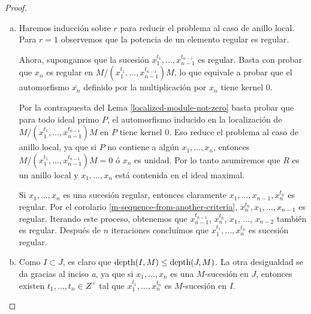 \begin{proof}
\begin{enumerate}[a.]
\item Haremos inducción sobre $r$ para reducir el problema al caso de anillo local. Para $r = 1$ observemos que la potencia de un elemento regular es regular.

Ahora, supongamos que la sucesión $x_1^{t_1},\dots,x_{n-1}^{t_{n-1}}$ es regular. Basta con probar que $x_n$ es regular en $M/(x_1^{t_1},\dots,x_{n-1}^{t_{n-1}})M$, lo que equivale a probar que el automorfismo $\bar{x_n}$ definido por la multiplicación por $x_n$ tiene kernel 0. 

Por la contrapuesta del Lema \ref{localized-module-not-zero} basta probar que para todo ideal primo $P$, el automorfismo inducido en la localización de $M/(x_1^{t_1},\dots,x_{n-1}^{t_{n-1}})M$ en $P$ tiene kernel 0. Eso reduce el problema al caso de anillo local, ya que si $P$ no contiene a algún $x_1,\dots,x_n$, entonces $M/(x_1^{t_1},\dots,x_{n-1}^{t_{n-1}})M = 0$ ó $x_n$ es unidad. Por lo tanto asumiremos que $R$ es un anillo local y $x_1,\dots,x_n$ está contenida en el ideal maximal.

Si $x_1,\dots,x_n$ es una sucesión regular, entonces claramente $x_1,\dots,x_{n-1},x_n^{t_n}$ es regular. Por el corolario \ref{m-sequence-from-another-criteria}, $x_n^{t_n},x_1,\dots,x_{n-1}$ es regular. Iterando este proceso, obtenemos que $x_{n-1}^{t_{n-1}}$, $x_n^{t_n}$, $x_1$, $\dots$, $x_{n-2}$ también es regular. Después de $n$ iteraciones concluímos que $x_1^{t_1},\dots,x_n^{t_n}$ es sucesión regular.

\item Como $I \subset J$, es claro que $\textrm{depth}(I,M) \leq \textrm{depth}(J,M)$. La otra desigualdad se da gracias al inciso \emph{a}, ya que si $x_1, \dots, x_n$ es una $M$-sucesión en $J$, entonces existen $t_1,\dots,t_n \in Z^+$ tal que $x_1^{t_1},\dots,x_n^{t_n}$ es $M$-sucesión en $I$.

\end{enumerate}
\end{proof}
